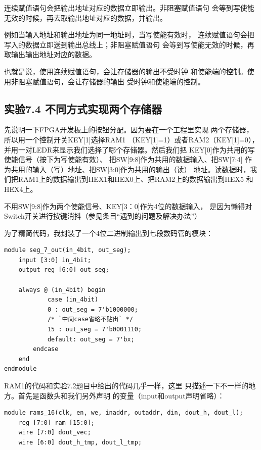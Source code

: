 \documentclass[12pt,a4paper,UTF8]{article}
\begin{document}
连续赋值语句会把输出地址对应的数据立即输出。非阻塞赋值语句
会等到写使能无效的时候，再去取输出地址对应的数据，并输出。

例如当输入地址和输出地址为同一地址时，当写使能有效时，
连续赋值语句会把写入的数据立即送到输出总线上；非阻塞赋值语句
会等到写使能无效的时候，再取输出输出地址对应的数据。

也就是说，使用连续赋值语句，会让存储器的输出不受时钟
和使能端的控制。使用非阻塞赋值语句，会让存储器的输出
受时钟和使能端的控制。

\subsection{实验7.4 不同方式实现两个存储器}
先说明一下FPGA开发板上的按钮分配。因为要在一个工程里实现
两个存储器，所以用一个控制开关\mbox{KEY[1]}选择\mbox{RAM1}
（\mbox{KEY[1]=1}）或者\mbox{RAM2}（\mbox{KEY[1]=0}），
并用一对LEDR来显示我们选择了哪个存储器。然后我们把
\mbox{KEY[0]}作为共用的写使能信号（按下为写使能有效）、
把\mbox{SW[9:8]}作为共用的数据输入、把\mbox{SW[7:4]}
作为共用的输入（写）地址、把\mbox{SW[3:0]}作为共用的输出（读）
地址。读数据时，我们把\mbox{RAM1}上的数据输出到\mbox{HEX1}和\linebreak[4]
\mbox{HEX0}上、把\mbox{RAM2}上的数据输出到\mbox{HEX5}
和\mbox{HEX4}上。

不用\mbox{SW[9:8]}作为两个使能信号、\mbox{KEY[3：0]}作为4位的数据输入，
是因为懒得对Switch开关进行按键消抖（参见条目``遇到的问题及解决办法''）

为了精简代码，我封装了一个4位二进制输出到七段数码管的模块：

\begin{lstlisting}[style=verilog-style]
module seg_7_out(in_4bit, out_seg);
	input [3:0] in_4bit;
	output reg [6:0] out_seg;
	
	always @ (in_4bit) begin
			case (in_4bit)
			0 : out_seg = 7'b1000000;
			/* `中间case省略不贴出` */
			15 : out_seg = 7'b0001110;
			default: out_seg = 7'bx;
		endcase
	end
endmodule
\end{lstlisting}

RAM1的代码和实验7.2题目中给出的代码几乎一样，这里
只描述一下不一样的地方。首先是函数头和我们另外声明
的变量（input和output声明省略）：

\begin{lstlisting}[style=verilog-style]
module rams_16(clk, en, we, inaddr, outaddr, din, dout_h, dout_l);
	reg [7:0] ram [15:0];
	wire [7:0] dout_vec;
	wire [6:0] dout_h_tmp, dout_l_tmp;
\end{lstlisting}
\end{document}
